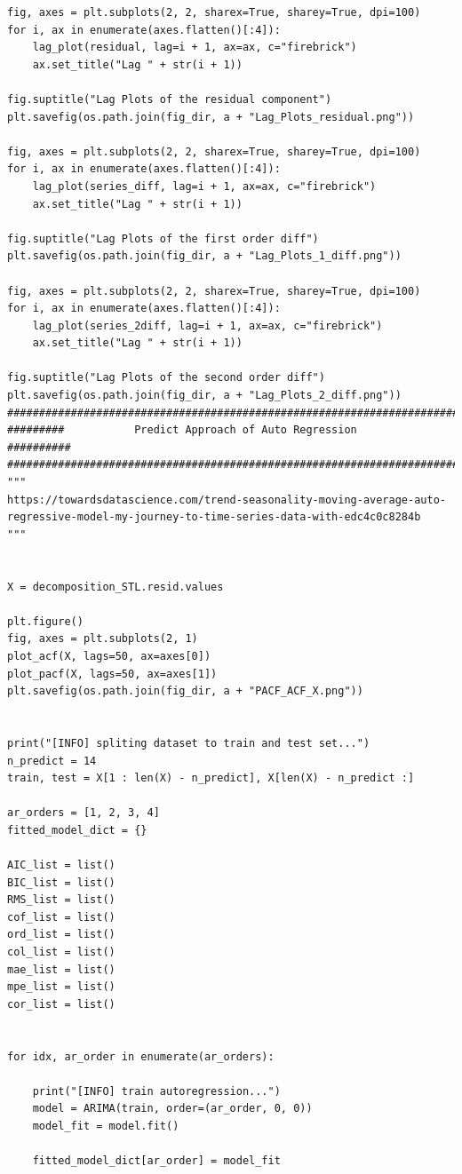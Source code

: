 \documentclass[12pt]{article}
\begin{document}
\begin{lstlisting}
fig, axes = plt.subplots(2, 2, sharex=True, sharey=True, dpi=100)
for i, ax in enumerate(axes.flatten()[:4]):
    lag_plot(residual, lag=i + 1, ax=ax, c="firebrick")
    ax.set_title("Lag " + str(i + 1))

fig.suptitle("Lag Plots of the residual component")
plt.savefig(os.path.join(fig_dir, a + "Lag_Plots_residual.png"))

fig, axes = plt.subplots(2, 2, sharex=True, sharey=True, dpi=100)
for i, ax in enumerate(axes.flatten()[:4]):
    lag_plot(series_diff, lag=i + 1, ax=ax, c="firebrick")
    ax.set_title("Lag " + str(i + 1))

fig.suptitle("Lag Plots of the first order diff")
plt.savefig(os.path.join(fig_dir, a + "Lag_Plots_1_diff.png"))

fig, axes = plt.subplots(2, 2, sharex=True, sharey=True, dpi=100)
for i, ax in enumerate(axes.flatten()[:4]):
    lag_plot(series_2diff, lag=i + 1, ax=ax, c="firebrick")
    ax.set_title("Lag " + str(i + 1))

fig.suptitle("Lag Plots of the second order diff")
plt.savefig(os.path.join(fig_dir, a + "Lag_Plots_2_diff.png"))
############################################################################
#########           Predict Approach of Auto Regression           ##########
############################################################################
"""
https://towardsdatascience.com/trend-seasonality-moving-average-auto-regressive-model-my-journey-to-time-series-data-with-edc4c0c8284b
"""


X = decomposition_STL.resid.values

plt.figure()
fig, axes = plt.subplots(2, 1)
plot_acf(X, lags=50, ax=axes[0])
plot_pacf(X, lags=50, ax=axes[1])
plt.savefig(os.path.join(fig_dir, a + "PACF_ACF_X.png"))


print("[INFO] spliting dataset to train and test set...")
n_predict = 14
train, test = X[1 : len(X) - n_predict], X[len(X) - n_predict :]

ar_orders = [1, 2, 3, 4]
fitted_model_dict = {}

AIC_list = list()
BIC_list = list()
RMS_list = list()
cof_list = list()
ord_list = list()
col_list = list()
mae_list = list()
mpe_list = list()
cor_list = list()


for idx, ar_order in enumerate(ar_orders):

    print("[INFO] train autoregression...")
    model = ARIMA(train, order=(ar_order, 0, 0))
    model_fit = model.fit()

    fitted_model_dict[ar_order] = model_fit


\end{lstlisting}
\end{document}
